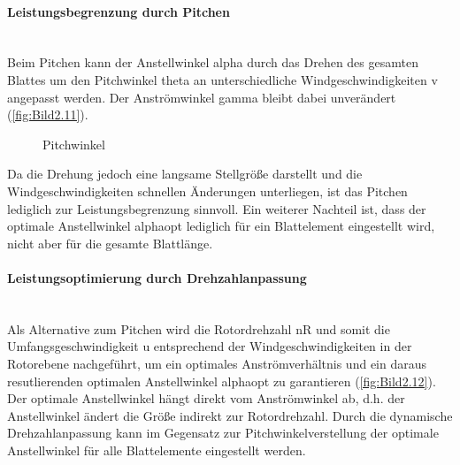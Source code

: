 \paragraph{Leistungsbegrenzung durch Pitchen}\mbox{}\smallskip\\
Beim Pitchen kann der Anstellwinkel \acs{alpha} durch das Drehen des gesamten Blattes um den Pitchwinkel \acs{theta} an unterschiedliche Windgeschwindigkeiten \acs{v} angepasst werden. Der Anströmwinkel \acs{gamma} bleibt dabei unverändert (\autoref{fig:Bild2.11}).
\begin{figure}[H]
   \centering
   \caption[Pitchwinkel]{Pitchwinkel \cite{SkriptSchulte}}
   \label{fig:Bild2.11}
\end{figure}

Da die Drehung jedoch eine langsame Stellgröße darstellt und die Windgeschwindigkeiten schnellen Änderungen unterliegen, ist das Pitchen lediglich zur Leistungsbegrenzung sinnvoll. Ein weiterer Nachteil ist, dass der optimale Anstellwinkel \acs{alphaopt} lediglich für ein Blattelement eingestellt wird, nicht aber für die gesamte Blattlänge.

\newpage
\paragraph{Leistungsoptimierung durch Drehzahlanpassung}\mbox{}\smallskip\\
Als Alternative zum Pitchen wird die Rotordrehzahl \acs{nR} und somit die Umfangsgeschwindigkeit \acs{u} entsprechend der Windgeschwindigkeiten in der Rotorebene nachgeführt, um ein optimales Anströmverhältnis und ein daraus resutlierenden optimalen Anstellwinkel \acs{alphaopt} zu garantieren (\autoref{fig:Bild2.12}). Der optimale Anstellwinkel hängt direkt vom Anströmwinkel ab, d.h. der Anstellwinkel ändert die Größe indirekt zur Rotordrehzahl. Durch die dynamische Drehzahlanpassung kann im Gegensatz zur Pitchwinkelverstellung der optimale Anstellwinkel für alle Blattelemente eingestellt werden.

